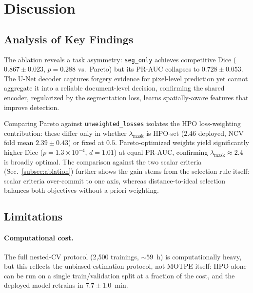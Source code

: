 \documentclass[final,5p,times,twocolumn,number]{elsarticle}
\newcommand{\rev}[1]{#1}
\begin{document}

\section{Discussion}
\label{sec:discussion}

\subsection{Analysis of Key Findings}

The ablation reveals a task asymmetry: \texttt{seg\_only} achieves competitive
Dice ($0.867 \pm 0.023$, $p = 0.288$ vs.\ Pareto) but its PR-AUC collapses to
$0.728 \pm 0.053$. The U-Net decoder captures forgery evidence for pixel-level
prediction yet cannot aggregate it into a reliable document-level decision,
confirming the shared encoder, regularized by the segmentation loss, learns
spatially-aware features that improve detection.

Comparing Pareto against \texttt{unweighted\_losses} isolates the HPO
loss-weighting contribution: these differ only in whether $\lambda_{\text{mask}}$
is HPO-set \rev{($2.46$ deployed, NCV fold mean $2.39 \pm 0.43$)} or fixed at
$0.5$. Pareto-optimized weights yield significantly higher Dice ($p =
1.3 \times 10^{-4}$, $d = 1.01$) at equal PR-AUC, confirming
$\lambda_{\text{mask}} \approx 2.4$ is broadly optimal. \rev{The comparison
against the two scalar criteria (Sec.~\ref{subsec:ablation}) further shows the
gain stems from the selection rule itself: scalar criteria over-commit to one
axis, whereas distance-to-ideal selection balances both objectives without a
priori weighting.}

\subsection{Limitations}

\paragraph{\rev{Computational cost.}}
\rev{The full nested-CV protocol (2{,}500 trainings, ${\sim}59$~h) is computationally
heavy, but this reflects the unbiased-estimation protocol, not MOTPE itself:
HPO alone can be run on a single train/validation split at a fraction of the
cost, and the deployed model retrains in $7.7 \pm 1.0$~min.}
\end{document}
